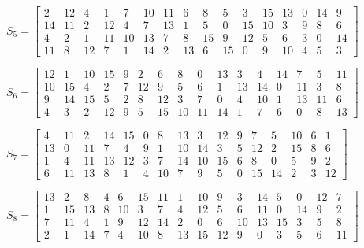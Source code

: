 \documentclass[11pt]{article}
\begin{document}
\begin{center}
    $ S_5 = 
    \begin{bmatrix}
        2 & 12 & 4 & 1 & 7 & 10 & 11 & 6 & 8 & 5 & 3 & 15 & 13 & 0 & 14 & 9 \\
        14 & 11 & 2 & 12 & 4 & 7 & 13 & 1 & 5 & 0 & 15 & 10 & 3 & 9 & 8 & 6 \\
        4 & 2 & 1 & 11 & 10 & 13 & 7 & 8 & 15 & 9 & 12 & 5 & 6 & 3 & 0 & 14 \\
        11 & 8 & 12 & 7 & 1 & 14 & 2 & 13 & 6 & 15 & 0 & 9 & 10 & 4 & 5 & 3 
    \end{bmatrix}$\\
    \vspace{3mm}

    $ S_6 = 
    \begin{bmatrix}
        12 & 1 & 10 & 15 & 9 & 2 & 6 & 8 & 0 & 13 & 3 & 4 & 14 & 7 & 5 & 11 \\
        10 & 15 & 4 & 2 & 7 & 12 & 9 & 5 & 6 & 1 & 13 & 14 & 0 & 11 & 3 & 8 \\
        9 & 14 & 15 & 5 & 2 & 8 & 12 & 3 & 7 & 0 & 4 & 10 & 1 & 13 & 11 & 6 \\
        4 & 3 & 2 & 12 & 9 & 5 & 15 & 10 & 11 & 14 & 1 & 7 & 6 & 0 & 8 & 13 
    \end{bmatrix}$\\
    \vspace{3mm}

    $ S_7 = 
    \begin{bmatrix}
        4 & 11 & 2 & 14 & 15 & 0 & 8 & 13 & 3 & 12 & 9 & 7 & 5 & 10 & 6 & 1 \\
        13 & 0 & 11 & 7 & 4 & 9 & 1 & 10 & 14 & 3 & 5 & 12 & 2 & 15 & 8 & 6 \\
        1 & 4 & 11 & 13 & 12 & 3 & 7 & 14 & 10 & 15 & 6 & 8 & 0 & 5 & 9 & 2 \\
        6 & 11 & 13 & 8 & 1 & 4 & 10 & 7 & 9 & 5 & 0 & 15 & 14 & 2 & 3 & 12 
    \end{bmatrix}$\\
    \vspace{3mm}

    $ S_8 = 
    \begin{bmatrix}
        13 & 2 & 8 & 4 & 6 & 15 & 11 & 1 & 10 & 9 & 3 & 14 & 5 & 0 & 12 & 7 \\
        1 & 15 & 13 & 8 & 10 & 3 & 7 & 4 & 12 & 5 & 6 & 11 & 0 & 14 & 9 & 2 \\
        7 & 11 & 4 & 1 & 9 & 12 & 14 & 2 & 0 & 6 & 10 & 13 & 15 & 3 & 5 & 8 \\
        2 & 1 & 14 & 7 & 4 & 10 & 8 & 13 & 15 & 12 & 9 & 0 & 3 & 5 & 6 & 11 
    \end{bmatrix}$\\    
\end{center}
\end{document}
